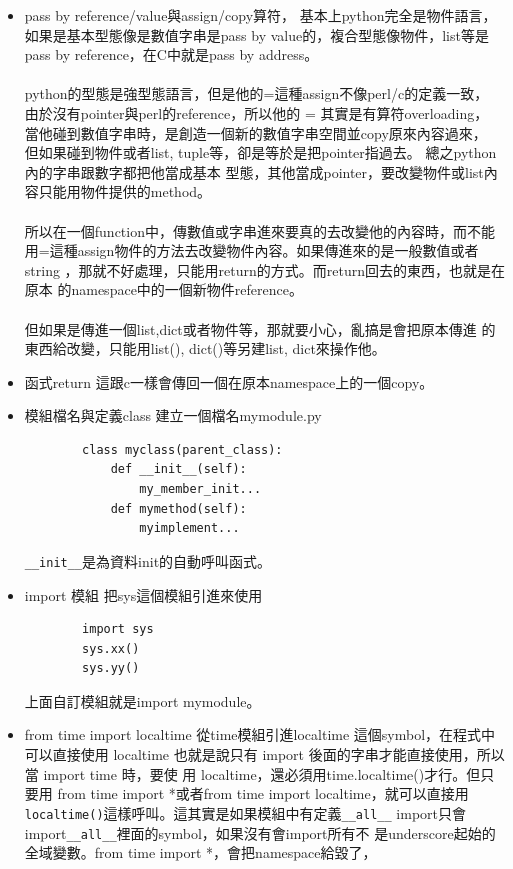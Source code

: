 \begin{itemize}
\item pass by reference/value與assign/copy算符，
	基本上python完全是物件語言，如果是基本型態像是數值字串是pass by 
	value的，複合型態像物件，list等是pass by reference，在C中就是pass by
	address。
	\\\\
	python的型態是強型態語言，但是他的=這種assign不像perl/c的定義一致，
	由於沒有pointer與perl的reference，所以他的 = 其實是有算符overloading，
	當他碰到數值字串時，是創造一個新的數值字串空間並copy原來內容過來，
	但如果碰到物件或者list, tuple等，卻是等於是把pointer指過去。
	總之python內的字串跟數字都把他當成基本
	型態，其他當成pointer，要改變物件或list內容只能用物件提供的method。
	\\\\
	所以在一個function中，傳數值或字串進來要真的去改變他的內容時，而不能
	用=這種assign物件的方法去改變物件內容。如果傳進來的是一般數值或者string
	，那就不好處理，只能用return的方式。而return回去的東西，也就是在原本
	的namespace中的一個新物件reference。
	\\\\
	但如果是傳進一個list,dict或者物件等，那就要小心，亂搞是會把原本傳進
        的東西給改變，只能用list(), dict()等另建list, dict來操作他。
\item 函式return
	這跟c一樣會傳回一個在原本namespace上的一個copy。
\item 模組檔名與定義class 建立一個檔名mymodule.py
        \begin{verbatim}
        class myclass(parent_class):
            def __init__(self):
                my_member_init...
            def mymethod(self):
                myimplement...
        \end{verbatim}
        \verb=__init__=是為資料init的自動呼叫函式。
\item import 模組
	把sys這個模組引進來使用
        \begin{verbatim}
        import sys
        sys.xx()
        sys.yy()
        \end{verbatim}
	上面自訂模組就是import mymodule。
\item from time import localtime
	從time模組引進localtime 這個symbol，在程式中可以直接使用 localtime
	也就是說只有 import 後面的字串才能直接使用，所以當 import time 時，要使
	用 localtime，還必須用time.localtime()才行。但只要用
	from time import *或者from time import localtime，就可以直接用
	\verb=localtime()=這樣呼叫。這其實是如果模組中有定義\verb=__all__=
	import只會import\verb=__all__=裡面的symbol，如果沒有會import所有不
	是underscore起始的全域變數。from time import *，會把namespace給毀了，

\end{itemize}

